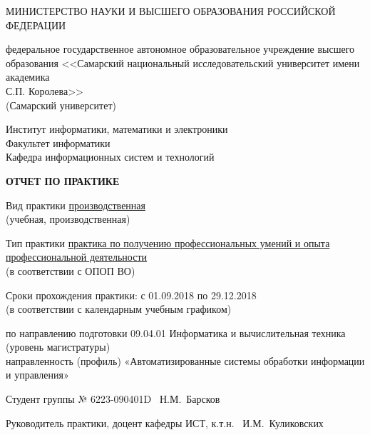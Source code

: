 \documentclass[a4paper, 12pt]{extreport}
\begin{document}
    \begin{center}
        МИНИСТЕРСТВО НАУКИ И ВЫСШЕГО ОБРАЗОВАНИЯ РОССИЙСКОЙ ФЕДЕРАЦИИ
        \vspace{12pt}

        федеральное государственное автономное образовательное учреждение высшего \\ образования
        <<Самарский национальный исследовательский университет имени академика \\ С.П. Королева>> \\
        (Самарский университет)
        \vspace{12pt}

        Институт информатики, математики и электроники \\
        Факультет информатики \\
        Кафедра информационных систем и технологий
        \vspace{60pt}

        \textbf{ОТЧЕТ ПО ПРАКТИКЕ}
        \vspace{36pt}

        Вид практики \underline{производственная} \\
        (учебная, производственная)
        \vspace{12pt}

        Тип практики \underline{практика по получению профессиональных умений и опыта} \\
        \underline{профессиональной деятельности} \\
        (в соответствии с ОПОП ВО)
        \vspace{12pt}

        Сроки прохождения практики: с 01.09.2018 по 29.12.2018 \\
        (в соответствии с календарным учебным графиком)
        \vspace{12pt}

        по направлению подготовки 09.04.01 Информатика и вычислительная техника \\
        (уровень магистратуры) \\
        направленность (профиль) «Автоматизированные системы обработки информации \\ и управления»
    \end{center}

    \noindent Студент группы № 6223-090401D \hrulefill \mbox{ Н.М. Барсков}

    \noindent Руководитель практики, \hfill \break
    доцент кафедры ИСТ, к.т.н. \hrulefill \mbox{ И.М. Куликовских}\vspace{36pt}
\end{document}
